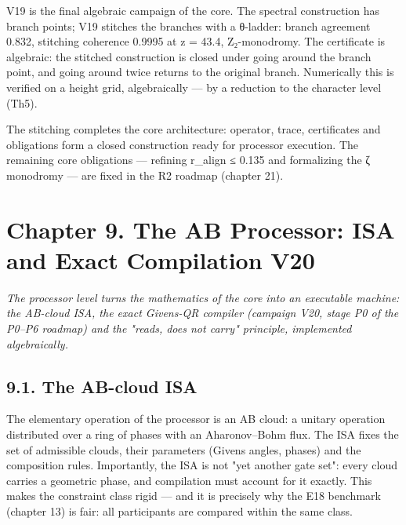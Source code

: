 \documentclass[11pt,a4paper]{article}
\begin{document}
V19 is the final algebraic campaign of the core. The spectral construction has branch points; V19 stitches the branches with a θ-ladder: branch agreement 0.832, stitching coherence 0.9995 at z = 43.4, Z₂-monodromy. The certificate is algebraic: the stitched construction is closed under going around the branch point, and going around twice returns to the original branch. Numerically this is verified on a height grid, algebraically — by a reduction to the character level (Th5).

\begin{center}\end{center}

The stitching completes the core architecture: operator, trace, certificates and obligations form a closed construction ready for processor execution. The remaining core obligations — refining r\_align ≤ 0.135 and formalizing the ζ monodromy — are fixed in the R2 roadmap (chapter 21).

\section{Chapter 9. The AB Processor: ISA and Exact Compilation V20}

\noindent\textit{\color{copper}The processor level turns the mathematics of the core into an executable machine: the AB-cloud ISA, the exact Givens-QR compiler (campaign V20, stage P0 of the P0–P6 roadmap) and the "reads, does not carry" principle, implemented algebraically.}

\subsection{9.1. The AB-cloud ISA}

The elementary operation of the processor is an AB cloud: a unitary operation distributed over a ring of phases with an Aharonov–Bohm flux. The ISA fixes the set of admissible clouds, their parameters (Givens angles, phases) and the composition rules. Importantly, the ISA is not "yet another gate set": every cloud carries a geometric phase, and compilation must account for it exactly. This makes the constraint class rigid — and it is precisely why the E18 benchmark (chapter 13) is fair: all participants are compared within the same class.
\end{document}
